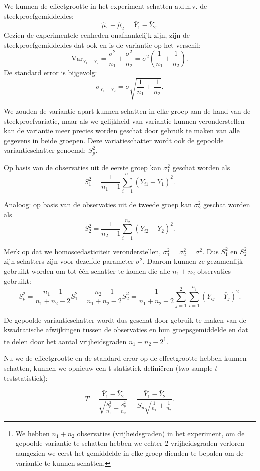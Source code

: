 \documentclass[
  12pt,dutch,coursenotes]{book}
\theoremstyle{definition}
\theoremstyle{definition}
\theoremstyle{definition}
\theoremstyle{remark}
\begin{document}
We kunnen de effectgrootte in het experiment schatten a.d.h.v. de steekproefgemiddeldes:
\[\hat \mu_1-\hat \mu_2=\bar Y_1 -\bar Y_2.\]
Gezien de experimentele eenheden onafhankelijk zijn, zijn de steekproefgemiddeldes dat ook en is de variantie op het verschil:
\[\text{Var}_{\bar Y_1 -\bar Y_2}=\frac{\sigma^2}{n_1}+\frac{\sigma^2}{n_2}=\sigma^2 \left(\frac{1}{n_1}+\frac{1}{n_2}\right).\]
De standard error is bijgevolg:
\[\sigma_{\bar Y_1 -\bar Y_2}=\sigma\sqrt{\frac{1}{n_1}+\frac{1}{n_2}}.\]

We zouden de variantie apart kunnen schatten in elke groep aan de hand van de steekproefvariatie, maar als we gelijkheid van variantie kunnen veronderstellen kan de variantie meer precies worden geschat door gebruik te maken van alle gegevens in beide groepen.
Deze variatieschatter wordt ook de gepoolde variantieschatter genoemd: \(S^2_p\).

Op basis van de observaties uit de eerste groep kan \(\sigma^2_1\) geschat worden als
\[S_1^2 = \frac{1}{n_1-1}\sum_{i=1}^{n_1} (Y_{i1}-\bar{Y}_1)^2.\]

Analoog: op basis van de observaties uit de tweede groep kan \(\sigma^2_2\) geschat worden als
\[S_2^2 = \frac{1}{n_2-1}\sum_{i=1}^{n_2} (Y_{i2}-\bar{Y}_2)^2.\]

Merk op dat we homoscedasticiteit veronderstellen, \(\sigma_1^2=\sigma_2^2=\sigma^2\). Dus \(S_1^2\) en \(S_2^2\) zijn schatters zijn voor dezelfde parameter \(\sigma^2\). Daarom kunnen ze gezamenlijk gebruikt worden om tot één schatter te komen die alle \(n_1+n_2\) observaties gebruikt:
\[  S_p^2 = \frac{n_1-1}{n_1+n_2-2} S_1^2 + \frac{n_2-1}{n_1+n_2-2} S_2^2 = \frac{1}{n_1+n_2-2}\sum_{j=1}^2\sum_{i=1}^{n_j} (Y_{ij} - \bar{Y}_j)^2.\]

De gepoolde variantieschatter wordt dus geschat door gebruik te maken van de kwadratische afwijkingen tussen de observaties en hun groepsgemiddelde en dat te delen door het aantal vrijheidsgraden \(n_1+n_2-2\)\footnote{We hebben \(n_1+n_2\) observaties (vrijheidsgraden) in het experiment, om de gepoolde variantie te schatten hebben we echter 2 vrijheidsgraden verloren aangezien we eerst het gemiddelde in elke groep dienden te bepalen om de variantie te kunnen schatten.}.

Nu we de effectgrootte en de standard error op de effectgrootte hebben kunnen schatten, kunnen we opnieuw een t-statistiek definiëren (two-sample \(t\)-teststatistiek):

\[T = \frac{\bar{Y}_1-\bar{Y}_2}{\sqrt{\frac{S_p^2}{n_1}+\frac{S_p^2}{n_2}}} =
  \frac{\bar{Y}_1 - \bar{Y}_2}{S_p\sqrt{\frac{1}{n_1}+\frac{1}{n_2}}}.\]
\end{document}
